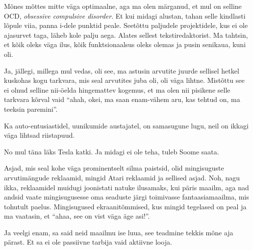 Mõnes mõttes mitte väga optimaalne, aga ma olen märganud, et mul on selline 
OCD, \emph{obsessive compulsive disorder}. Et kui midagi alustan, tahan selle 
kindlasti lõpule viia, panna i-dele punktid peale. Seetõttu paljudele 
projektidele, kus ei ole ajasurvet taga, läheb kole palju aega. Alates sellest 
tekstiredaktorist. Ma tahtsin, et kõik oleks väga ilus, kõik funktsionaalsus 
oleks olemas ja pusin senikaua, kuni oli. 


Ja, jällegi, millega mul vedas, oli see, ma astusin arvutite juurde sellisel 
hetkel kuskohas kogu tarkvara, mis seal arvutites juba oli, oli väga lihtne. 
Mistõttu see ei olnud selline nii-öelda hingemattev kogemus, et ma olen nii 
pisikene selle tarkvara kõrval vaid \enquote{ahah, okei, ma saan enam-vähem 
aru, kas tehtud on, ma teeksin paremini}.


Ka auto-entusiastidel, uunikumide austajatel, on samasugune lugu, neil on 
ikkagi väga lihtsad riistapuud.


No mul täna läks Tesla katki. Ja midagi ei ole teha, tuleb Soome saata.


Asjad, mis seal kohe väga prominentselt silma paistsid, olid mingisuguste 
arvutimängude reklaamid, mingid Atari reklaamid ja sellised asjad. Noh, nagu 
ikka, reklaamidel muidugi joonistati natuke ilusamaks, kui päris maailm, aga 
nad andsid vaate mingisugusesse oma seaduste järgi toimivasse fantaasiamaailma, 
mis tohutult paelus. Mingisugused ekraanitõmmised, kus mingid tegelased on peal 
ja ma vaatasin, et \enquote{ahaa, see on vist väga äge asi!}.


Ja veelgi enam, sa said neid maailmu ise luua, see teadmine tekkis mõne aja 
pärast. Et sa ei ole passiivne tarbija vaid aktiivne looja.


